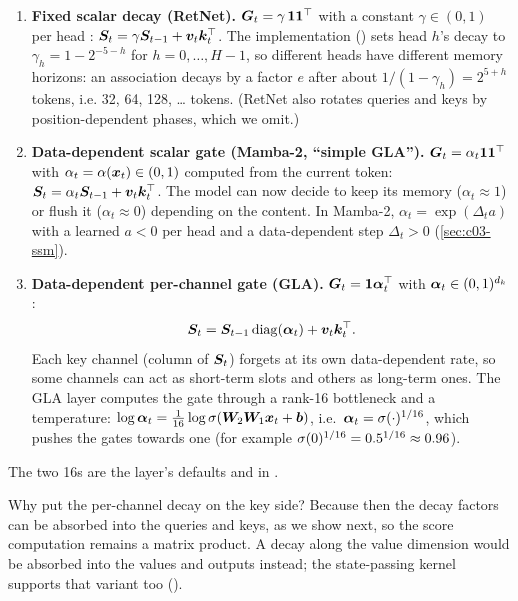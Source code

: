 \begin{enumerate}
\item \textbf{Fixed scalar decay (RetNet).} $\bm{G}_t=\gamma\,\bm 1\bm 1^{\top}$ with a constant
$\gamma\in(0,1)$ per head \citep{sun2023retnet}:
$\bm{S}_t=\gamma\bm{S}_{t-1}+\bm{v}_t\bm{k}_t^{\top}$. The \fla{} implementation
() sets head $h$'s
decay to $\gamma_h=1-2^{-5-h}$ for $h=0,\dots,H-1$, so different heads have different memory
horizons: an association decays by a factor $e$ after about $1/(1-\gamma_h)=2^{5+h}$ tokens, i.e.
32, 64, 128, \dots{} tokens. (RetNet also rotates queries and keys by position-dependent phases,
which we omit.)
\item \textbf{Data-dependent scalar gate (Mamba-2, ``simple GLA'').} $\bm{G}_t=\alpha_t\bm 1\bm 1^{\top}$
with $\alpha_t=\alpha(\bm{x}_t)\in(0,1)$ computed from the current token:
$\bm{S}_t=\alpha_t\bm{S}_{t-1}+\bm{v}_t\bm{k}_t^{\top}$. The model can now decide to keep its memory
($\alpha_t\approx1$) or flush it ($\alpha_t\approx0$) depending on the content. In Mamba-2,
$\alpha_t=\exp(\Delta_t a)$ with a learned $a<0$ per head and a data-dependent step
$\Delta_t>0$ (\cref{sec:c03-ssm}).
\item \textbf{Data-dependent per-channel gate (GLA).} $\bm{G}_t=\bm 1\bm{\alpha}_t^{\top}$ with
$\bm{\alpha}_t\in(0,1)^{d_k}$ \citep{yang2024gla}:
\begin{equation}\label{eq:c03-gla}
  \bm{S}_t=\bm{S}_{t-1}\operatorname{diag}(\bm{\alpha}_t)+\bm{v}_t\bm{k}_t^{\top} .
\end{equation}
Each key channel (column of $\bm{S}_t$) forgets at its own data-dependent rate, so some channels can
act as short-term slots and others as long-term ones. The \fla{} GLA layer computes the gate
through a rank-16 bottleneck and a temperature:
$\log\bm{\alpha}_t=\frac{1}{16}\log\sigma(\bm{W}_2\bm{W}_1\bm{x}_t+\bm{b})$, i.e.\
$\bm{\alpha}_t=\sigma(\cdot)^{1/16}$, which pushes the gates towards one (for example
$\sigma(0)^{1/16}=0.5^{1/16}\approx0.96$).
\end{enumerate}
\begin{sloppypar}
\noindent The two 16s are the layer's defaults  and
\code{gate_logit_normalizer=16} in
.
\end{sloppypar}

Why put the per-channel decay on the key side? Because then the decay factors can be absorbed
into the queries and keys, as we show next, so the score computation remains a matrix product. A
decay along the value dimension would be absorbed into the values and outputs instead; the
\fla{} state-passing kernel supports that variant too (\code{gv}).

